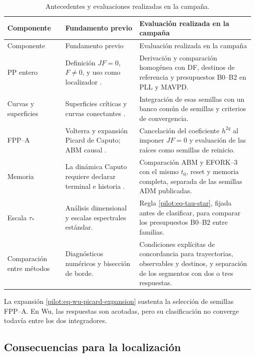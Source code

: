 \begin{longtable}{@{}L{3.2cm}L{4.1cm}L{5.8cm}@{}}
\caption{Antecedentes y evaluaciones realizadas en la campaña.}
\label{pilot:tab-novelty}\\
\toprule
Componente & Fundamento previo & Evaluación realizada en la campaña\\
\midrule
\endfirsthead
\toprule
Componente & Fundamento previo & Evaluación realizada en la campaña\\
\midrule
\endhead
PP entero & Definición $JF=0$, $F\ne0$, y uso como localizador
\cite{Prasad2015Perpetual,DudkowskiPrasadKapitaniak2017,
DudkowskiPrasadKapitaniak2018}. & Derivación y comparación homogénea con DF,
destinos de referencia y presupuestos B0--B2 en PLL y MAVPD.\\
Curvas y superficies & Superficies críticas y curvas conectantes
\cite{GilmoreEtAl2010Connecting,GuanXie2021Connecting}. & Integración de esas
semillas con un banco común de semillas y criterios de convergencia.\\
FPP--A & Volterra y expansión Picard de Caputo; ABM causal
\cite{DiethelmFordFreed2002}. & Cancelación del coeficiente $h^{2q}$ al imponer $JF=0$ y evaluación de las
raíces como semillas de reinicio.\\
Memoria & La dinámica Caputo requiere declarar terminal e historia
\cite{CongTuan2017Nonlocal,DoanKloeden2021Semidynamical}. & Comparación ABM y
EFORK--3 con el mismo $t_0$, reset y memoria completa, separada de las semillas
ADM publicadas.\\
Escala $\tau_*$ & Análisis dimensional y escalas espectrales estándar. & Regla
\eqref{pilot:eq-tau-star}, fijada antes de clasificar, para comparar los
presupuestos B0--B2 entre familias.\\
Comparación entre métodos & Diagnósticos numéricos y bisección de borde. &
Condiciones explícitas de concordancia para trayectorias, observables y
destinos, y separación de los segmentos con dos o tres respuestas.\\
\bottomrule
\end{longtable}

La expansión \eqref{pilot:eq-wu-picard-expansion} sustenta la selección de
semillas FPP--A. En Wu, las respuestas son acotadas, pero su clasificación
no converge todavía entre los dos integradores.

\subsection{Consecuencias para la localización}


